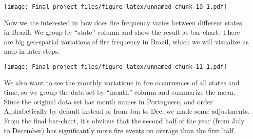 \documentclass[
]{article}
\newenvironment{Shaded}{\begin{snugshade}}{\end{snugshade}}
\newcommand{\AttributeTok}[1]{\textcolor[rgb]{0.13,0.29,0.53}{#1}}
\newcommand{\DecValTok}[1]{\textcolor[rgb]{0.00,0.00,0.81}{#1}}
\newcommand{\FunctionTok}[1]{\textcolor[rgb]{0.13,0.29,0.53}{\textbf{#1}}}
\newcommand{\NormalTok}[1]{#1}
\newcommand{\OtherTok}[1]{\textcolor[rgb]{0.56,0.35,0.01}{#1}}
\newcommand{\SpecialCharTok}[1]{\textcolor[rgb]{0.81,0.36,0.00}{\textbf{#1}}}
\newcommand{\StringTok}[1]{\textcolor[rgb]{0.31,0.60,0.02}{#1}}
\begin{document}
\texttt{[image: Final\_project\_files/figure-latex/unnamed-chunk-10-1.pdf]}

Now we are interested in how does fire frequency varies between
different states in Brazil. We group by ``state'' column and show the
result as bar-chart. There are big geo-spatial variations of fire
frequency in Brazil, which we will visualize as map in later steps.

\begin{Shaded}
\end{Shaded}

\texttt{[image: Final\_project\_files/figure-latex/unnamed-chunk-11-1.pdf]}

We also want to see the monthly variations in fire occurrences of all
states and time, so we group the data set by ``month'' column and
summarize the mean. Since the original data set has month names in
Portuguese, and order Alphabetically by default instead of from Jan to
Dec, we made some adjustments. From the final bar-chart, it's obvious
that the second half of the year (from July to December) has
significantly more fire events on average than the first half.
\end{document}
